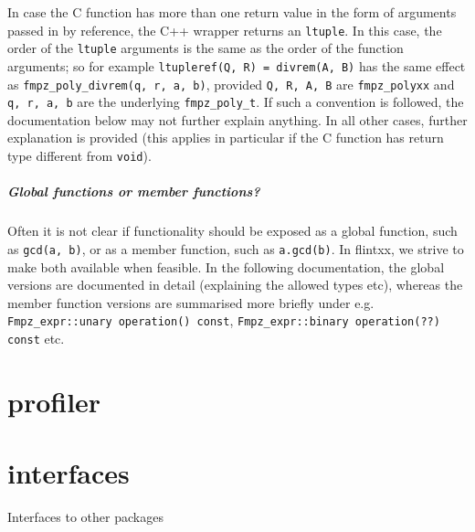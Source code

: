 \documentclass[a4paper,10pt]{book}
\newcommand{\code}{\lstinline}
\begin{document}
{{In case the C function has more than one return value in the form of arguments
passed in by reference, the C++ wrapper returns an \code{ltuple}. In this case,
the order of the \code{ltuple} arguments is the same as the order of the
function arguments; so for example \code{ltupleref(Q, R) = divrem(A, B)} has the
same effect as \code{fmpz_poly_divrem(q, r, a, b)}, provided \code{Q, R, A, B}
are \code{fmpz_polyxx} and \code{q, r, a, b} are the underlying
\code{fmpz_poly_t}. If such a convention is followed, the documentation below
may not further explain anything. In all other cases, further explanation is
provided (this applies in particular if the C function has return type different
from \code{void}).

\paragraph{Global functions or member functions?} Often it is not clear if
functionality should be exposed as a global function,
such as \code{gcd(a, b)}, or as a member
function, such as \code{a.gcd(b)}. In flintxx, we strive to make both available
when feasible. In the following documentation, the global versions are
documented in detail (explaining the allowed types etc), whereas the member
function versions are summarised more briefly under e.g.
\code{Fmpz_expr::unary operation() const},
\code{Fmpz_expr::binary operation(??) const} etc.




\chapter{profiler}




\chapter{interfaces}
\epigraph{Interfaces to other packages}{}

}}
\end{document}

